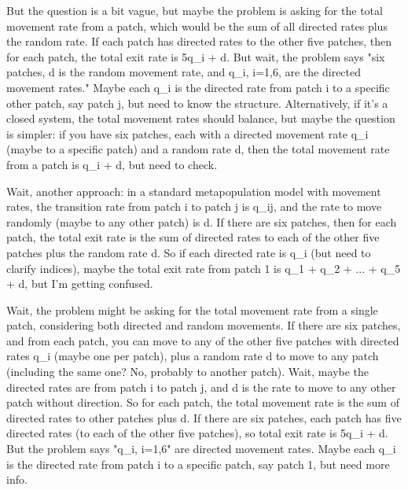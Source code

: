 But the question is a bit vague, but maybe the problem is asking for the total movement rate from a patch, which would be the sum of all directed rates plus the random rate. If each patch has directed rates to the other five patches, then for each patch, the total exit rate is 5q_i + d. But wait, the problem says "six patches, d is the random movement rate, and q_i, i=1,6, are the directed movement rates." Maybe each q_i is the directed rate from patch i to a specific other patch, say patch j, but need to know the structure. Alternatively, if it's a closed system, the total movement rates should balance, but maybe the question is simpler: if you have six patches, each with a directed movement rate q_i (maybe to a specific patch) and a random rate d, then the total movement rate from a patch is q_i + d, but need to check. 

Wait, another approach: in a standard metapopulation model with movement rates, the transition rate from patch i to patch j is q_ij, and the rate to move randomly (maybe to any other patch) is d. If there are six patches, then for each patch, the total exit rate is the sum of directed rates to each of the other five patches plus the random rate d. So if each directed rate is q_i (but need to clarify indices), maybe the total exit rate from patch 1 is q_1 + q_2 + ... + q_5 + d, but I'm getting confused. 

Wait, the problem might be asking for the total movement rate from a single patch, considering both directed and random movements. If there are six patches, and from each patch, you can move to any of the other five patches with directed rates q_i (maybe one per patch), plus a random rate d to move to any patch (including the same one? No, probably to another patch). Wait, maybe the directed rates are from patch i to patch j, and d is the rate to move to any other patch without direction. So for each patch, the total movement rate is the sum of directed rates to other patches plus d. If there are six patches, each patch has five directed rates (to each of the other five patches), so total exit rate is 5q_i + d. But the problem says "q_i, i=1,6" are directed movement rates. Maybe each q_i is the directed rate from patch i to a specific patch, say patch 1, but need more info. 

